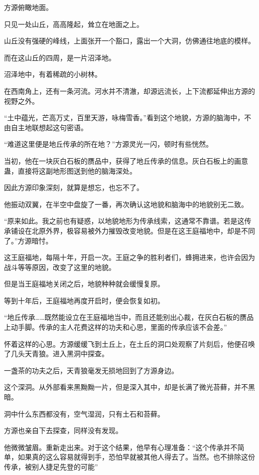
\begin{this_body}

方源俯瞰地面。

只见一处山丘，高高隆起，耸立在地面之上。

山丘没有强硬的峰线，上面张开一个豁口，露出一个大洞，仿佛通往地底的模样。

而在这山丘的四周，是一片沼泽地。

沼泽地中，有着稀疏的小树林。

在西南角上，还有一条河流。河水并不清澈，却源远流长，上下流都延伸出方源的视野之外。

“土中蕴光，芒高万丈，百里天游，咏梅雪香。”看到这个地貌，方源的脑海中，不由自主地联想起这句密语。

“难道这里便是地丘传承的所在地？”方源灵光一闪，顿时有些恍然。

当初，他在一块灰白石板的赝品中，获得了地丘传承的信息。灰白石板上的画意蛊，直接将这副地形图送到他的脑海深处。

因此方源印象深刻，就算是想忘，也忘不了。

他振动双翼，在半空中盘旋了一番，再次确认这地貌和脑海中的地貌别无二致。

“原来如此。我之前也有疑惑，以地貌地形为传承线索，这通常不靠谱。若是这传承铺设在北原外界，极容易被外力摧毁改变地貌。但是在这王庭福地中，却是不同了。”方源暗忖。

这王庭福地，每隔十年，开启一次。王庭之争的胜利者们，蜂拥进来，也许会因为战斗等等原因，改变了这里的地貌。

但是当王庭福地关闭之后，地貌种种就会缓慢复原。

等到十年后，王庭福地再度开启时，便会恢复如初。

“地丘传承……既然能设立在王庭福地当中，而且还能别出心裁，在灰白石板的赝品上动手脚。传承的主人花费这样的功夫和心思，里面的传承应该不会差。”

怀着这样的心思。方源缓缓飞到土丘上，在土丘的洞口处观察了片刻后，他便召唤了几头天青狼。进入黑洞中探查。

一盏茶的功夫之后，天青狼毫发无损地回到了方源身边。

这个深洞。从外部看来黑黝黝一片，但是深入其中，却是长满了微光苔藓，并不黑暗。

洞中什么东西都没有，空气湿润，只有土石和苔藓。

方源也亲自下去探查，同样没有发现。

他微微皱眉。重新走出来。对于这个结果，他早有心理准备：“这个传承并不简单，如果真的这么容易就得到手，恐怕早就被其他人得去了。当然。也不排除这份传承，被别人捷足先登的可能”


\end{this_body}
